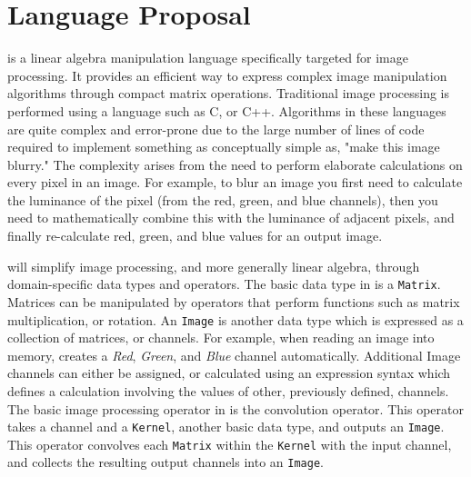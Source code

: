 \section*{Language Proposal}


\sys{} is a linear algebra manipulation language specifically targeted for
image processing. It provides an efficient way to express complex image
manipulation algorithms through compact matrix operations. Traditional image
processing is performed using a language such as C, or C++. Algorithms in these
languages are quite complex and error-prone due to the large number of lines of
code required to implement something as conceptually simple as, "make this image
blurry." The complexity arises from the need to perform elaborate calculations
on every pixel in an image. For example, to blur an image you first need to
calculate the luminance of the pixel (from the red, green, and blue channels),
then you need to mathematically combine this with the luminance of adjacent pixels,
and finally re-calculate red, green, and blue values for an output image.

\sys{} will simplify image processing, and more generally linear algebra, through
domain-specific data types and operators. The basic data type in \sys{} is a 
\texttt{Matrix}. Matrices can be manipulated by operators that perform functions
such as matrix multiplication, or rotation. An \texttt{Image} is another \sys{}
data type which is expressed as a collection of matrices, or channels. For example,
when reading an image into memory, \sys{} creates a \emph{Red}, \emph{Green}, and
\emph{Blue} channel automatically. Additional Image channels can either be assigned,
or calculated using an expression syntax which defines a calculation involving the
values of other, previously defined, channels. The basic image processing operator
in \sys{} is the convolution operator. This operator takes a channel and a
\texttt{Kernel}, another basic data type, and outputs an \texttt{Image}. This
operator convolves each \texttt{Matrix} within the \texttt{Kernel} with the input channel,
and collects the resulting output channels into an \texttt{Image}.

